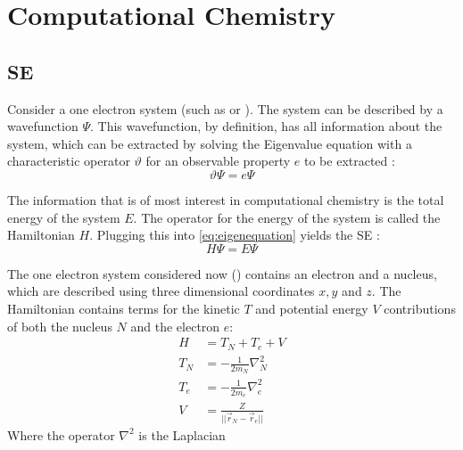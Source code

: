 \documentclass[../master_thesis.tex]{subfiles}
\begin{document}
\chapter{Computational Chemistry}
\section{\ac{SE}}

Consider a one electron system (such as  or ). The system can be
described by a wavefunction $\Psi$. This wavefunction, by definition, has all
information about the system, which can be extracted by solving the Eigenvalue
equation with a characteristic operator $\vartheta$ for an observable property
$ e $ to be extracted \cite{Cramer:2004}:
\begin{equation}
  \vartheta\Psi = e\Psi\label{eq:eigenequation}
\end{equation}

The information that is of most interest in computational chemistry is the total
energy of the system $ E $. The operator for the energy of the system is called
the Hamiltonian $H$. Plugging this into \ref{eq:eigenequation} yields the
\ac{SE} \cite{Cramer:2004, Jensen:2017}:
\begin{equation}
  H\Psi = E\Psi\label{eq:SE}
\end{equation}

The one electron system considered now () contains an electron and a
nucleus, which are described using three dimensional coordinates $ x, y $ and
$ z $. The Hamiltonian contains terms for the kinetic $T$ and potential energy
$V$ contributions of both the nucleus $ N $ and the electron $ e $:
\begin{equation}
  \begin{aligned}
    H   &= T_N + T_e + V \\
    T_N &= -\frac{1}{2m_N}\nabla^2_N \\
    T_e &= -\frac{1}{2m_e}\nabla^2_e \\
    V   &= \frac{Z}{||\vec{r}_N - \vec{r}_e||}
  \end{aligned}
\end{equation}
Where the operator $ \nabla^2$ is the Laplacian


\biblio
\end{document}
